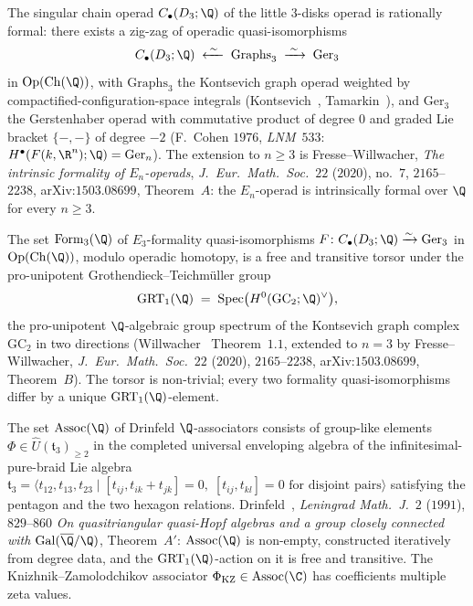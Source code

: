 \begin{proposition}
\label{prop:cfg-e3-formality-rational}
The singular chain operad $C_\bullet(D_3; \Q)$ of the little $3$-disks operad is rationally formal: there exists a zig-zag of operadic quasi-isomorphisms
\[
 C_\bullet(D_3; \Q) \;\xleftarrow{\;\sim\;}\; \mathrm{Graphs}_3 \;\xrightarrow{\;\sim\;}\; \mathrm{Ger}_3
\]
in $\mathrm{Op}(\mathrm{Ch}(\Q))$, with $\mathrm{Graphs}_3$ the Kontsevich graph operad weighted by compactified-configuration-space integrals (Kontsevich~\cite{Kontsevich1999}, Tamarkin~\cite{Tamarkin2007}), and $\mathrm{Ger}_3$ the Gerstenhaber operad with commutative product of degree $0$ and graded Lie bracket $\{-, -\}$ of degree $-2$ (F.~Cohen $1976$, \textit{LNM}~$533$: $H^\bullet(F(k, \R^n); \Q) = \mathrm{Ger}_n$). The extension to $n \geq 3$ is Fresse--Willwacher, \emph{The intrinsic formality of $E_n$-operads}, \textit{J.~Eur.~Math.~Soc.}~$22$ ($2020$), no.~$7$, $2165$--$2238$, arXiv:$1503.08699$, Theorem~$A$: the $E_n$-operad is intrinsically formal over $\Q$ for every $n \geq 3$.
\end{proposition}

\begin{theorem}[Formality space at $d = 3$ is a $\mathrm{GRT}_1(\Q)$-torsor]
\label{thm:cfg-form3-grt1-torsor}
The set $\mathrm{Form}_3(\Q)$ of $E_3$-formality quasi-isomorphisms $F \colon C_\bullet(D_3; \Q) \xrightarrow{\sim} \mathrm{Ger}_3$ in $\mathrm{Op}(\mathrm{Ch}(\Q))$, modulo operadic homotopy, is a free and transitive torsor under the pro-unipotent Grothendieck--Teichm\"uller group
\[
 \mathrm{GRT}_1(\Q) \;=\; \mathrm{Spec}\bigl(H^0(\mathrm{GC}_2; \Q)^\vee\bigr),
\]
the pro-unipotent $\Q$-algebraic group spectrum of the Kontsevich graph complex $\mathrm{GC}_2$ in two directions (Willwacher~\cite{Willwacher2015} Theorem~$1.1$, extended to $n = 3$ by Fresse--Willwacher, \textit{J.~Eur.~Math.~Soc.}~$22$ ($2020$), $2165$--$2238$, arXiv:$1503.08699$, Theorem~$B$). The torsor is non-trivial; every two formality quasi-isomorphisms differ by a unique $\mathrm{GRT}_1(\Q)$-element.
\end{theorem}

\begin{definition}
\label{def:drinfeld-q-associator-cfg}
The set $\mathrm{Assoc}(\Q)$ of Drinfeld $\Q$-associators consists of group-like elements $\Phi \in \hat{U}(\mathfrak{t}_3)_{\geq 2}$ in the completed universal enveloping algebra of the infinitesimal-pure-braid Lie algebra $\mathfrak{t}_3 = \langle t_{12}, t_{13}, t_{23} \mid [t_{ij}, t_{ik} + t_{jk}] = 0,\; [t_{ij}, t_{kl}] = 0 \text{ for disjoint pairs} \rangle$ satisfying the pentagon and the two hexagon relations. Drinfeld~\cite{Drinfeld1990}, \textit{Leningrad Math.~J.}~$2$ ($1991$), $829$--$860$ \emph{On quasitriangular quasi-Hopf algebras and a group closely connected with $\mathrm{Gal}(\overline{\Q}/\Q)$}, Theorem~$A'$: $\mathrm{Assoc}(\Q)$ is non-empty, constructed iteratively from degree data, and the $\mathrm{GRT}_1(\Q)$-action on it is free and transitive. The Knizhnik--Zamolodchikov associator $\Phi_{\mathrm{KZ}} \in \mathrm{Assoc}(\C)$ has coefficients multiple zeta values.
\end{definition}

